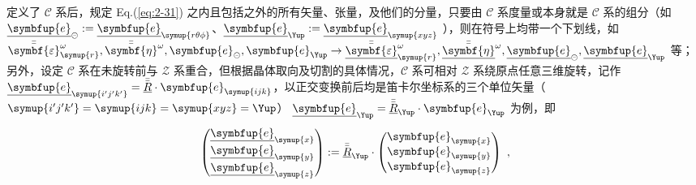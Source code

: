 定义了 $\mathcal{C}$ 系后，规定 Eq.(\ref{eq:2-31}) 之内且包括之外的所有矢量、张量，及他们的分量，只要由 $\mathcal{C}$ 系度量或本身就是 $\mathcal{C}$ 系的组分（如 $\underline{\symbfup{e}}_{\circleddash}:= \underline{\symbfup{e}}_{{\symup{r\theta\phi}}}$、$\underline{\symbfup{e}}_{\Yup}:= \underline{\symbfup{e}}_{{\symup{xyz}}}$ ），则在符号上均带一个下划线，如 $\bar{\bar{\symbf{\varepsilon}}}_{\symup{r}}^{\omega}, \bar{\bar{\symbf{\eta}}}^\omega, \symbfup{e}_{\circleddash}, \symbfup{e}_{\Yup} \rightarrow \bar{\bar{\underline{\symbf{\varepsilon}}}}_{\symup{r}}^{\omega}, \bar{\bar{\underline{\symbf{\eta}}}}^{\omega}, \underline{\symbfup{e}}_{\circleddash}, \underline{\symbfup{e}}_{\Yup}$ 等；另外，设定 $\mathcal{C}$ 系在未旋转前与 $\mathcal{Z}$ 系重合，但根据晶体取向及切割的具体情况，$\mathcal{C}$ 系可相对 $\mathcal{Z}$ 系绕原点任意三维旋转，记作 $\underline{\symbfup{e}}_{{\symup{i'j'k'}}} = \bar{\bar{\underline{R}}} \cdot \symbfup{e}_{{\symup{ijk}}}$，以正交变换前后均是笛卡尔坐标系的三个单位矢量（${\symup{i'j'k'}} = {\symup{ijk}} = {\symup{xyz}} = \Yup$） $\underline{\symbfup{e}}_{\Yup} = \bar{\bar{\underline{R}}}_{\Yup} \cdot \symbfup{e}_{\Yup}$ 为例，即
\begin{equation} \label{eq:2-35}
    \begin{pmatrix} \underline{\symbfup{e}}_{{\symup{x}}} \\ \underline{\symbfup{e}}_{{\symup{y}}} \\ \underline{\symbfup{e}}_{{\symup{z}}} \end{pmatrix} := \bar{\bar{\underline{R}}}_{\Yup} \cdot \begin{pmatrix} \symbfup{e}_{{\symup{x}}} \\ \symbfup{e}_{{\symup{y}}} \\ \symbfup{e}_{{\symup{z}}} \end{pmatrix} ~,
\end{equation}
